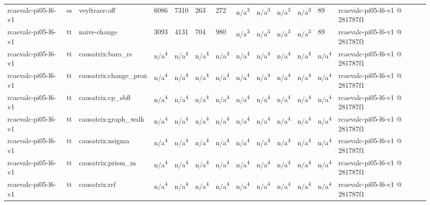 \begin{table}[t]
\begin{tabular}{lllllllllllll}
rcaevalc-pi05-l6-v1 & ss & veyltrace:off & 6086 & 7310 & 263 & 272 & n/a\textsuperscript{3} & n/a\textsuperscript{3} & n/a\textsuperscript{3} & n/a\textsuperscript{3} & 89 & rcaevalc-pi05-l6-v1 @ 281787f1 \\
rcaevalc-pi05-l6-v1 & tt & naive-change & 3093 & 4131 & 704 & 980 & n/a\textsuperscript{3} & n/a\textsuperscript{3} & n/a\textsuperscript{3} & n/a\textsuperscript{3} & 89 & rcaevalc-pi05-l6-v1 @ 281787f1 \\
rcaevalc-pi05-l6-v1 & tt & causatrix:baro\_rs & n/a\textsuperscript{4} & n/a\textsuperscript{4} & n/a\textsuperscript{4} & n/a\textsuperscript{4} & n/a\textsuperscript{4} & n/a\textsuperscript{4} & n/a\textsuperscript{4} & n/a\textsuperscript{4} & n/a\textsuperscript{4} & rcaevalc-pi05-l6-v1 @ 281787f1 \\
rcaevalc-pi05-l6-v1 & tt & causatrix:change\_prox & n/a\textsuperscript{4} & n/a\textsuperscript{4} & n/a\textsuperscript{4} & n/a\textsuperscript{4} & n/a\textsuperscript{4} & n/a\textsuperscript{4} & n/a\textsuperscript{4} & n/a\textsuperscript{4} & n/a\textsuperscript{4} & rcaevalc-pi05-l6-v1 @ 281787f1 \\
rcaevalc-pi05-l6-v1 & tt & causatrix:cp\_sbfl & n/a\textsuperscript{4} & n/a\textsuperscript{4} & n/a\textsuperscript{4} & n/a\textsuperscript{4} & n/a\textsuperscript{4} & n/a\textsuperscript{4} & n/a\textsuperscript{4} & n/a\textsuperscript{4} & n/a\textsuperscript{4} & rcaevalc-pi05-l6-v1 @ 281787f1 \\
rcaevalc-pi05-l6-v1 & tt & causatrix:graph\_walk & n/a\textsuperscript{4} & n/a\textsuperscript{4} & n/a\textsuperscript{4} & n/a\textsuperscript{4} & n/a\textsuperscript{4} & n/a\textsuperscript{4} & n/a\textsuperscript{4} & n/a\textsuperscript{4} & n/a\textsuperscript{4} & rcaevalc-pi05-l6-v1 @ 281787f1 \\
rcaevalc-pi05-l6-v1 & tt & causatrix:nsigma & n/a\textsuperscript{4} & n/a\textsuperscript{4} & n/a\textsuperscript{4} & n/a\textsuperscript{4} & n/a\textsuperscript{4} & n/a\textsuperscript{4} & n/a\textsuperscript{4} & n/a\textsuperscript{4} & n/a\textsuperscript{4} & rcaevalc-pi05-l6-v1 @ 281787f1 \\
rcaevalc-pi05-l6-v1 & tt & causatrix:prism\_m & n/a\textsuperscript{4} & n/a\textsuperscript{4} & n/a\textsuperscript{4} & n/a\textsuperscript{4} & n/a\textsuperscript{4} & n/a\textsuperscript{4} & n/a\textsuperscript{4} & n/a\textsuperscript{4} & n/a\textsuperscript{4} & rcaevalc-pi05-l6-v1 @ 281787f1 \\
rcaevalc-pi05-l6-v1 & tt & causatrix:rrf & n/a\textsuperscript{4} & n/a\textsuperscript{4} & n/a\textsuperscript{4} & n/a\textsuperscript{4} & n/a\textsuperscript{4} & n/a\textsuperscript{4} & n/a\textsuperscript{4} & n/a\textsuperscript{4} & n/a\textsuperscript{4} & rcaevalc-pi05-l6-v1 @ 281787f1 \\

\end{tabular}
\end{table}
